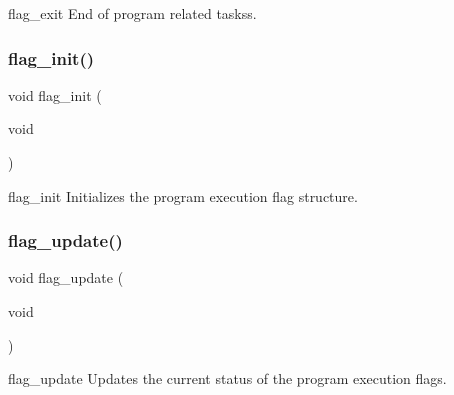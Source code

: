 flag\+\_\+exit End of program related taskss. \mbox{\label{flag_8c_a48860dbc8264329bfb945a28588ea0ac}} 
\subsubsection{flag\+\_\+init()}
{\footnotesize\ttfamily void flag\+\_\+init (\begin{DoxyParamCaption}\item[{void}]{ }\end{DoxyParamCaption})}

flag\+\_\+init Initializes the program execution flag structure. \mbox{\label{flag_8c_a66960dac8a57870a9fba18923340dd80}} 
\subsubsection{flag\+\_\+update()}
{\footnotesize\ttfamily void flag\+\_\+update (\begin{DoxyParamCaption}\item[{void}]{ }\end{DoxyParamCaption})}

flag\+\_\+update Updates the current status of the program execution flags. 